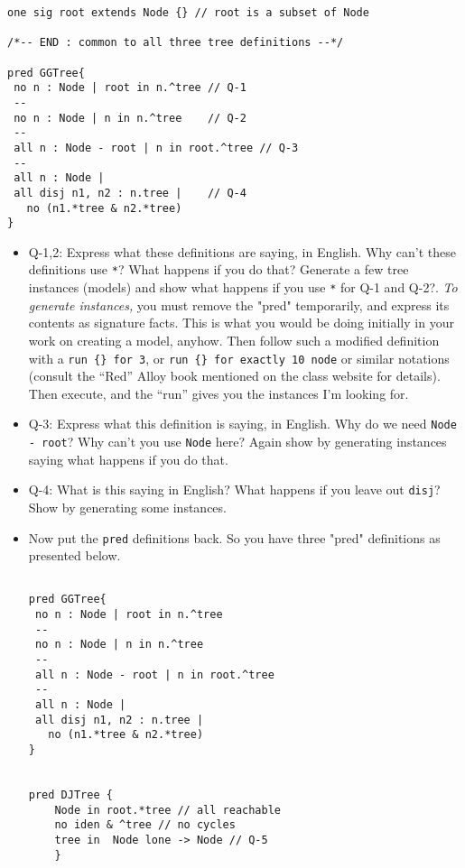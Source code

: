 \documentclass[11pt]{article}
\begin{document}
\begin{enumerate}
\begin{scriptsize}
\begin{verbatim}
one sig root extends Node {} // root is a subset of Node

/*-- END : common to all three tree definitions --*/

pred GGTree{
 no n : Node | root in n.^tree // Q-1
 --
 no n : Node | n in n.^tree    // Q-2
 --
 all n : Node - root | n in root.^tree // Q-3
 -- 
 all n : Node |
 all disj n1, n2 : n.tree |    // Q-4
   no (n1.*tree & n2.*tree) 
}
  \end{verbatim}
  \end{scriptsize}

\begin{itemize}
\item[] Q-1,2: Express what these definitions are saying, in English.
Why can't these definitions use \verb|*|? What happens if you do that?
 Generate
a few tree instances (models) and show what happens if you use \verb|*| for Q-1 and Q-2?.
%
{\em To generate instances,} you must remove the "pred" temporarily, and express its
contents as signature facts.
This is what you would be doing initially in your work on creating a model, anyhow.
Then follow such a modified definition with a
\verb|run {} for 3|,
or
\verb|run {} for exactly 10 node|
or
similar notations (consult the ``Red'' Alloy book mentioned on the class website for details).
Then execute, and the ``run'' gives you the instances I'm looking for.

\item[] Q-3: Express what this definition is saying, in English.
Why do we need \verb|Node - root|? Why can't you use \verb|Node| here?
Again show by generating instances saying what happens if you do that.

\item[] Q-4: What is this saying in English?
What happens if you leave out \verb|disj|?
Show by generating some instances.

\item Now put the {\tt pred} definitions back. So you have three "pred" definitions as presented below.

\begin{scriptsize}
\begin{verbatim}

pred GGTree{
 no n : Node | root in n.^tree
 --
 no n : Node | n in n.^tree
 --
 all n : Node - root | n in root.^tree
 -- 
 all n : Node |
 all disj n1, n2 : n.tree |  
   no (n1.*tree & n2.*tree) 
}


pred DJTree {
    Node in root.*tree // all reachable
    no iden & ^tree // no cycles
    tree in  Node lone -> Node // Q-5
    }


\end{verbatim}
\end{scriptsize}
\end{itemize}
\end{enumerate}
\end{document}
